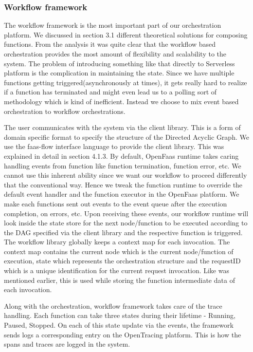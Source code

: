 \documentclass[12pt,titlepage]{article}
\begin{document}
\subsubsection{Workflow framework}
\label{sec:org1003d76}
The workflow framework is the most important part of our orchestration platform.
We discussed in section 3.1 different theoretical solutions for composing
functions. From the analysis it was quite clear that the workflow based
orchestration provides the most amount of flexibility and scalability to the
system. The problem of introducing something like that directly to Serverless
platform is the complication in maintaining the state. Since we have multiple
functions getting triggered(asynchronously at times), it gets really hard to
realize if a function has terminated and might even lead us to a polling sort of
methodology which is kind of inefficient. Instead we choose to mix event based
orchestration to workflow orchestrations.

The user communicates with the system via the client library. This is a form of
domain specific format to specify the structure of the Directed Acyclic Graph.
We use the faas-flow interface language to provide the client library. This was
explained in detail in section 4.1.3. By default, OpenFaas runtime takes caring handling events from function like
function termination, function error, etc. We cannot use this inherent ability
since we want our workflow to proceed differently that the conventional way.
Hence we tweak the function runtime to override the default event handler and
the function executor in the OpenFaas platform. We make each functions sent out
events to the event queue after the execution completion, on errors, etc. Upon
receiving these events, our workflow runtime will look inside the state store
for the next node/function to be executed according to the DAG specified via the
client library and the respective function is triggered. The workflow library
globally keeps a context map for each invocation. The context map contains the
current node which is the current node/function of execution, state which
represents the orchestration structure and the requestID which is a unique
identification for the current request invocation. Like was mentioned earlier,
this is used while storing the function intermediate data of each invocation.

Along with the orchestration, workflow framework takes care of the trace
handling. Each function can take three states during their lifetime - Running,
Paused, Stopped. On each of this state update via the events, the framework
sends logs a corresponding entry on the OpenTracing platform. This is how the
spans and traces are logged in the system.
\end{document}
